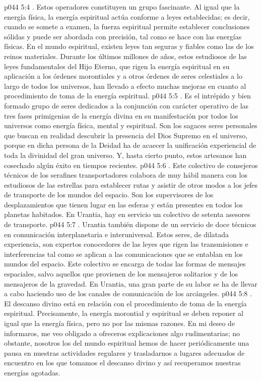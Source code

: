\vs p044 5:4 . Estos operadores constituyen un grupo fascinante. Al igual que la energía física, la energía espiritual actúa conforme a leyes establecidas; es decir, cuando se somete a examen, la fuerza espiritual permite establecer conclusiones sólidas y puede ser abordada con precisión, tal como se hace con las energías físicas. En el mundo espiritual, existen leyes tan seguras y fiables como las de los reinos materiales. Durante los últimos millones de años, estos estudiosos de las leyes fundamentales del Hijo Eterno, que rigen la energía espiritual en su aplicación a los órdenes morontiales y a otros órdenes de seres celestiales a lo largo de todos los universos, han llevado a efecto muchas mejoras en cuanto al procedimiento de toma de la energía espiritual.
\vs p044 5:5 . Es el intrépido y bien formado grupo de seres dedicados a la conjunción con carácter operativo de las tres fases primigenias de la energía divina en su manifestación por todos los universos como energía física, mental y espiritual. Son los sagaces seres personales que buscan en realidad descubrir la presencia del Dios Supremo en el universo, porque en dicha persona de la Deidad ha de acaecer la unificación experiencial de toda la divinidad del gran universo. Y, hasta cierto punto, estos artesanos han cosechado algún éxito en tiempos recientes.
\vs p044 5:6 . Este colectivo de consejeros técnicos de los serafines transportadores colabora de muy hábil manera con los estudiosos de las estrellas para establecer rutas y asistir de otros modos a los jefes de transporte de los mundos del espacio. Son los supervisores de los desplazamientos que tienen lugar en las esferas y están presentes en todos los planetas habitados. En Urantia, hay en servicio un colectivo de setenta asesores de transporte.
\vs p044 5:7 . Urantia también dispone de un servicio de doce técnicos en comunicación interplanetaria e interuniversal. Estos seres, de dilatada experiencia, son expertos conocedores de las leyes que rigen las transmisiones e interferencias tal como se aplican a las comunicaciones que se entablan en los mundos del espacio. Este colectivo se encarga de todas las formas de mensajes espaciales, salvo aquellos que provienen de los mensajeros solitarios y de los mensajeros de la gravedad. En Urantia, una gran parte de su labor se ha de llevar a cabo haciendo uso de los canales de comunicación de los arcángeles.
\vs p044 5:8 . El descanso divino está en relación con el procedimiento de toma de la energía espiritual. Precisamente, la energía morontial y espiritual se deben reponer al igual que la energía física, pero no por las mismas razones. En mi deseo de informaros, me veo obligado a ofreceros explicaciones algo rudimentarias; no obstante, nosotros los del mundo espiritual hemos de hacer periódicamente una pausa en nuestras actividades regulares y trasladarnos a lugares adecuados de encuentro en los que tomamos el descanso divino y así recuperamos nuestras energías agotadas.
